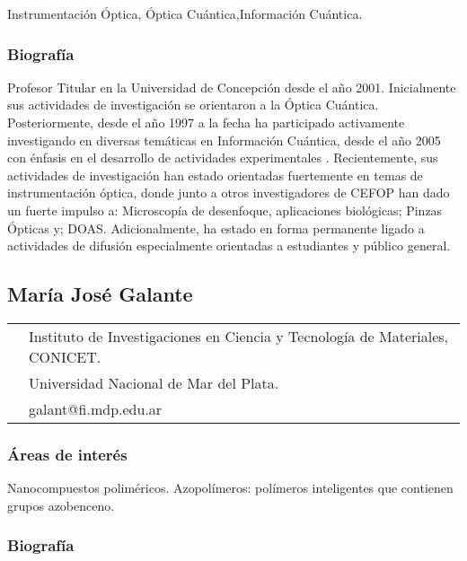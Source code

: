 Instrumentaci\'on \'Optica, \'Optica Cu\'antica,Informaci\'on Cu\'antica.

\subsubsection*{Biograf\'ia}

Profesor Titular en la Universidad de Concepci\'on desde el año 2001.
Inicialmente sus actividades de investigaci\'on se orientaron a la \'Optica
Cu\'antica. Posteriormente, desde el año 1997 a la fecha ha participado
activamente investigando en diversas tem\'aticas en Informaci\'on Cu\'antica,
desde el año 2005 con \'enfasis en el desarrollo de actividades experimentales .
Recientemente, sus actividades de investigaci\'on han estado orientadas
fuertemente en temas de instrumentaci\'on \'optica, donde junto a otros
investigadores de CEFOP
han dado un fuerte impulso a: Microscop\'ia de desenfoque, aplicaciones
biol\'ogicas; Pinzas \'Opticas y; DOAS. Adicionalmente, ha estado en forma
permanente ligado a actividades de difusi\'on especialmente orientadas a
estudiantes y p\'ublico general.


\subsection*{Mar\'ia Jos\'e Galante}

\begin{tabular}{ l l}
{\multirow{3}{*}{\texttt{[image: galante]}}} & Instituto
de Investigaciones en Ciencia y Tecnolog\'ia de Materiales, CONICET. \\
 & Universidad Nacional de Mar del Plata.   \\
 & galant@fi.mdp.edu.ar
\end{tabular}

\subsubsection*{Áreas de inter\'es}

Nanocompuestos polim\'ericos. Azopol\'imeros: pol\'imeros inteligentes que
contienen grupos azobenceno.

\subsubsection*{Biograf\'ia}


